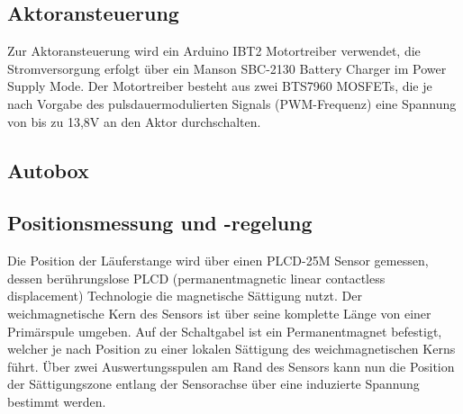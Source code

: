 \subsection{Aktoransteuerung}

Zur Aktoransteuerung wird ein Arduino IBT2 Motortreiber verwendet, die Stromversorgung erfolgt über ein Manson SBC-2130 Battery Charger im Power Supply Mode. Der Motortreiber besteht aus zwei BTS7960 MOSFETs, die je nach Vorgabe des pulsdauermodulierten Signals (PWM-Frequenz) eine Spannung von bis zu 13,8V an den Aktor durchschalten. 

\subsection{Autobox}


\subsection {Positionsmessung und -regelung}

Die Position der Läuferstange wird über einen PLCD-25M Sensor gemessen, dessen berührungslose PLCD (permanentmagnetic linear contactless displacement) Technologie die magnetische Sättigung nutzt. Der weichmagnetische Kern des Sensors ist über seine komplette Länge von einer Primärspule umgeben. Auf der Schaltgabel ist ein Permanentmagnet befestigt, welcher je nach Position zu einer lokalen Sättigung des weichmagnetischen Kerns führt. Über zwei Auswertungsspulen am Rand des Sensors kann nun die Position der Sättigungszone entlang der Sensorachse über eine induzierte Spannung bestimmt werden.

